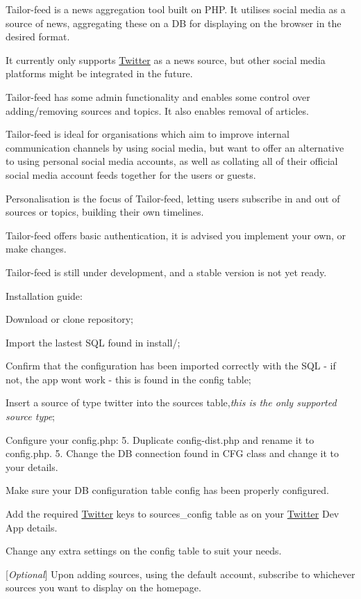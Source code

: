 Tailor-\/feed is a news aggregation tool built on P\+HP. It utilises social media as a source of news, aggregating these on a DB for displaying on the browser in the desired format.


\begin{DoxyItemize}
\item It currently only supports \mbox{\hyperlink{class_twitter}{Twitter}} as a news\textquotesingle{} source, but other social media platforms might be integrated in the future.
\item Tailor-\/feed has some admin functionality and enables some control over adding/removing sources and topics. It also enables removal of articles.
\item Tailor-\/feed is ideal for organisations which aim to improve internal communication channels by using social media, but want to offer an alternative to using personal social media accounts, as well as collating all of their official social media account feeds together for the users or guests.
\item Personalisation is the focus of Tailor-\/feed, letting users subscribe in and out of sources or topics, building their own timelines.
\item Tailor-\/feed offers basic authentication, it is advised you implement your own, or make changes.
\end{DoxyItemize}



 

Tailor-\/feed is still under development, and a stable version is not yet ready.

Installation guide\+:
\begin{DoxyEnumerate}
\item Download or clone {\ttfamily repository};
\item Import the lastest S\+QL found in {\ttfamily install/};
\item Confirm that the configuration has been imported correctly with the S\+QL -\/ if not, the app won\textquotesingle{}t work -\/ this is found in the {\ttfamily config} table;
\item Insert a source of type {\ttfamily twitter} into the {\ttfamily sources} table,{\itshape  this is the only supported source type};
\item Configure your {\ttfamily config.\+php}\+: 5. Duplicate {\ttfamily config-\/dist.\+php} and rename it to {\ttfamily config.\+php}. 5. Change the DB connection found in {\ttfamily C\+FG} class and change it to your details.
\item Make sure your DB configuration table {\ttfamily config} has been properly configured.
\item Add the required \mbox{\hyperlink{class_twitter}{Twitter}} keys to {\ttfamily sources\+\_\+config} table as on your \mbox{\hyperlink{class_twitter}{Twitter}} Dev App details.
\item Change any extra settings on the {\ttfamily config} table to suit your needs.
\item \mbox{[}{\itshape Optional}\mbox{]} Upon adding sources, using the default account, subscribe to whichever sources you want to display on the homepage.
\end{DoxyEnumerate}

